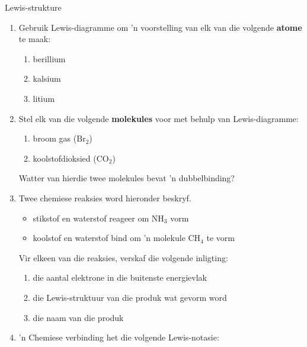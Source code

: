             \begin{exercises}{Lewis-strukture}
{
            \nopagebreak
      \label{m38701*id140889}\begin{enumerate}[noitemsep, label=\textbf{\arabic*}. ] 
            \label{m38701*uid23}\item Gebruik Lewis-diagramme om 'n voorstelling van elk van die volgende \textbf{atome} te maak:
\label{m38701*id140910}\begin{enumerate}[noitemsep, label=\textbf{\alph*}. ] 
            \label{m38701*uid24}\item berillium
\label{m38701*uid25}\item kalsium
\label{m38701*uid26}\item litium
\end{enumerate}
                \label{m38701*uid27}\item  Stel elk van die volgende \textbf{molekules} voor met behulp van Lewis-diagramme:
\label{m38701*id140969}\begin{enumerate}[noitemsep, label=\textbf{\alph*}. ] 
            \label{m38701*uid28}\item broom gas ($\text{Br}{}_{2}$)
\label{m38701*uid29}\item koolstofdioksied ($\text{CO}{}_{2}$)
\end{enumerate}
Watter van hierdie twee molekules bevat 'n dubbelbinding?
\label{m38701*uid31}\item Twee chemiese reaksies word hieronder beskryf.
\label{m38701*id141048}\begin{itemize}[noitemsep]
            \label{m38701*uid32}\item stikstof en waterstof reageer om $\text{NH}_{3}$ vorm
\label{m38701*uid33}\item koolstof en waterstof bind om 'n molekule $\text{CH}_{4}$ te vorm
\end{itemize}
Vir elkeen van die reaksies, verskaf die volgende inligting:
\label{m38701*id141106}\begin{enumerate}[noitemsep, label=\textbf{\alph*}. ] 
\item die aantal elektrone in die buitenste energievlak
\label{m38701*uid35}\item die Lewis-struktuur van die produk wat gevorm word
\label{m38701*uid37}\item die naam van die produk
\end{enumerate}
                \label{m38701*uid38}\item 'n Chemiese verbinding het die volgende Lewis-notasie:

\end{enumerate}}
\end{exercises}
